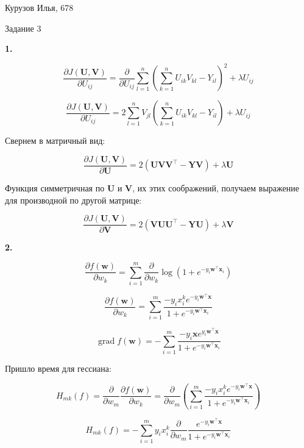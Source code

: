 \documentclass[12pt]{article}
\DeclareMathOperator*{\grad}{grad}
\begin{document}
\begin{center}
	{Курузов Илья, 678}

	{Задание 3}
\end{center}

\begin{center}
	\textbf{1.}
\end{center}

$$\frac{\partial J(\textbf{U}, \textbf{V})}{\partial U_{ij}} = \frac{\partial}{\partial U_{ij}}\sum\limits_{l=1}^n\left(\sum\limits_{k=1}^n U_{ik}V_{kl} - Y_{il}\right)^2 + \lambda U_{ij}$$

$$\frac{\partial J(\textbf{U}, \textbf{V})}{\partial U_{ij}} = 2\sum\limits_{l=1}^nV_{jl}\left(\sum\limits_{k=1}^n U_{ik}V_{kl} - Y_{il}\right) + \lambda U_{ij}$$

Свернем в матричный вид:

$$\boxed{\frac{\partial J(\textbf{U}, \textbf{V})}{\partial \textbf{U}} = 2\left(\textbf{UVV}^\top - \textbf{YV}\right)+\lambda \textbf{U}}$$

Функция симметричная по $\textbf{U}$ и $\textbf{V}$, их этих соображений, получаем выражение для производной по другой матрице:

$$\boxed{\frac{\partial J(\textbf{U}, \textbf{V})}{\partial \textbf{V}} = 2\left(\textbf{VUU}^\top - \textbf{YU}\right)+\lambda \textbf{V}}$$

\begin{center}
	\textbf{2.}
\end{center}

$$\frac{\partial f(\textbf{w})}{\partial w_k} = \sum\limits_{i=1}^m\frac{\partial}{\partial w_k}\log\left(1+e^{-y_i\textbf{w}^\top\textbf{x}_i}\right)$$

$$\frac{\partial f(\textbf{w})}{\partial w_k} = \sum\limits_{i=1}^m\frac{-y_ix_i^ke^{-y_i\textbf{w}^\top\textbf{x}}}{1+e^{-y_i\textbf{w}^\top\textbf{x}_i}}$$

$$\boxed{\grad f(\textbf{w}) = -\sum\limits_{i=1}^m\frac{-y_i\textbf{x}e^{y_i\textbf{w}^\top\textbf{x}}}{1+e^{-y_i\textbf{w}^\top\textbf{x}_i}}}$$

Пришло время для гессиана:

$$H_{mk}(f) = \frac{\partial}{\partial w_m}\frac{\partial f(\textbf{w})}{\partial w_k} = \frac{\partial}{\partial w_m}\left(\sum\limits_{i=1}^m\frac{-y_ix_i^ke^{-y_i\textbf{w}^\top\textbf{x}}}{1+e^{-y_i\textbf{w}^\top\textbf{x}_i}}\right)$$

$$H_{mk}(f) = -\sum\limits_{i=1}^my_ix_i^k\frac{\partial}{\partial w_m}\frac{e^{-y_i\textbf{w}^\top\textbf{x}}}{1+e^{-y_i\textbf{w}^\top\textbf{x}_i}}$$
\end{document}
